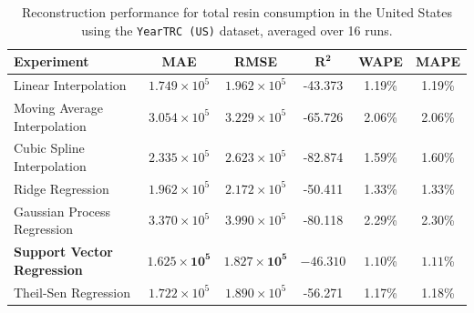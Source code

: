 \begin{table}[!ht]
	\centering
	\caption{\centering Reconstruction performance for total resin consumption in the United States using the \texttt{YearTRC (US)} dataset, averaged over 16 runs.}
	\begin{tabular}{@{}lccccc@{}}
		\toprule
		\textbf{Experiment}                & \textbf{MAE}                   & \textbf{RMSE}                  & $\mathbf{R^2}$       & \textbf{WAPE}       & \textbf{MAPE}       \\
		\midrule
		Linear Interpolation               & \(1.749 \times 10^5\)          & \(1.962 \times 10^5\)          & -43.373              & 1.19\%              & 1.19\%              \\
		Moving Average Interpolation       & \(3.054 \times 10^5\)          & \(3.229 \times 10^5\)          & -65.726              & 2.06\%              & 2.06\%              \\
		Cubic Spline Interpolation         & \(2.335 \times 10^5\)          & \(2.623 \times 10^5\)          & -82.874              & 1.59\%              & 1.60\%              \\
		Ridge Regression                   & \(1.962 \times 10^5\)          & \(2.172 \times 10^5\)          & -50.411              & 1.33\%              & 1.33\%              \\
		Gaussian Process Regression        & \(3.370 \times 10^5\)          & \(3.990 \times 10^5\)          & -80.118              & 2.29\%              & 2.30\%              \\
		\textbf{Support Vector Regression} & \(\mathbf{1.625 \times 10^5}\) & \(\mathbf{1.827 \times 10^5}\) & \(\mathbf{-46.310}\) & \(\mathbf{1.10}\)\% & \(\mathbf{1.11}\)\% \\
		Theil-Sen Regression               & \(1.722 \times 10^5\)          & \(1.890 \times 10^5\)          & -56.271              & 1.17\%              & 1.18\%              \\
		\hline
	\end{tabular}
	\label{tab:reconstruction_united_states}
\end{table}
